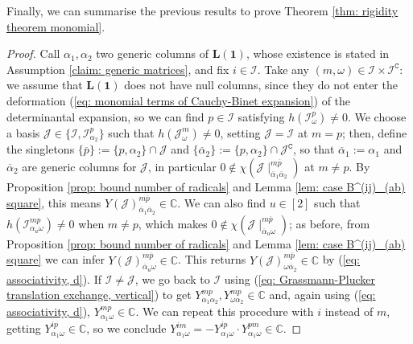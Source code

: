 \documentclass[10pt]{article}
\theoremstyle{remark}%
\theoremstyle{definition}%
\begin{document}
Finally, we can summarise the previous results to prove Theorem \ref{thm: rigidity theorem monomial}. 
\begin{proof}
Call $\alpha_{1},\alpha_{2}$ two generic columns of $\mathbf{L}(\mathbf{1})$, whose existence is stated in Assumption \ref{claim: generic matrices}, and fix $i\in\mathcal{I}$. Take any $(m,\omega)\in\mathcal{I}\times\mathcal{I}^{\mathtt{C}}$: we assume that $\mathbf{L}(\mathbf{1})$ does not have null columns, since they do not enter the deformation (\ref{eq: monomial terms of Cauchy-Binet expansion}) of the determinantal expansion, so we can find $p\in\mathcal{I}$ satisfying $h(\mathcal{I}_{\omega}^{p})\neq0$. We choose a basis $\mathcal{J}\in\{\mathcal{I},\mathcal{I}_{\alpha_{2}}^{p}\}$ such that $h(\mathcal{J}_{\omega}^{m})\neq0$, setting $\mathcal{J}=\mathcal{I}$ at $m=p$; then, define the singletons $\{\overline{p}\}:=\{p,\alpha_{2}\}\cap\mathcal{J}$ and $\{\overline{\alpha}_{2}\}:=\{p,\alpha_{2}\}\cap\mathcal{J}^{\mathtt{C}}$, so that $\overline{\alpha}_{1}:=\alpha_{1}$ and $\overline{\alpha}_{2}$ are generic columns for $\mathcal{J}$, in particular $0\notin\chi(\mathcal{J}\mid_{\overline{\alpha}_{1}\overline{\alpha}_{2}}^{m\overline{p}})$ at $m\neq p$. By Proposition \ref{prop: bound number of radicals} and Lemma \ref{lem: case B^(ij)_(ab) square}, this means $Y(\mathcal{J})_{\overline{\alpha}_{1}\overline{\alpha}_{2}}^{m\overline{p}}\in\mathbb{C}$. We can also find $u\in[2]$ such that $h(\mathcal{I}_{\alpha_{u}\omega}^{mp})\neq 0$ when $m\neq p$, which makes $0\notin\chi(\mathcal{J}\mid_{\overline{\alpha}_{u}\omega}^{m\overline{p}})$; as before, from Proposition \ref{prop: bound number of radicals} and Lemma \ref{lem: case B^(ij)_(ab) square} we can infer $Y(\mathcal{J})_{\overline{\alpha}_{u}\omega}^{m\overline{p}}\in\mathbb{C}$. This returns $Y(\mathcal{J})_{\omega\overline{\alpha}_{2}}^{m\overline{p}}\in\mathbb{C}$ by (\ref{eq: associativity, d}). If $\mathcal{I}\neq\mathcal{J}$, we go back to $\mathcal{I}$ using (\ref{eq: Grassmann-Plucker translation exchange, vertical}) to get $Y_{\alpha_{1}\alpha_{2}}^{mp},Y_{\omega\alpha_{2}}^{mp}\in\mathbb{C}$ and, again using (\ref{eq: associativity, d}), $Y_{\alpha_{1}\omega}^{mp}\in\mathbb{C}$. We can repeat this procedure with $i$ instead of $m$, getting $Y_{\alpha_{1}\omega}^{ip}\in\mathbb{C}$, so we conclude $Y_{\alpha_{1}\omega}^{im}=-Y_{\alpha_{1}\omega}^{ip}\cdot Y_{\alpha_{1}\omega}^{pm}\in\mathbb{C}$. 


\end{proof}
\end{document}

